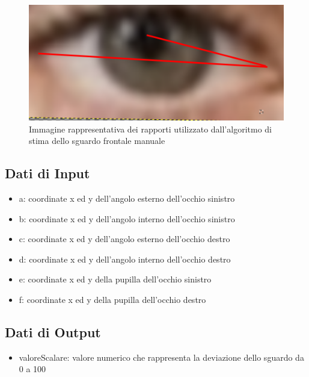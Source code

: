 \documentclass[12pt,a4paper,openright,twoside]{book}
\begin{document}
\begin{figure}
    \centering
    \includegraphics[width=.4\linewidth]{figures/frontal_gaze_manual.png}
    \caption{Immagine rappresentativa dei rapporti utilizzato dall'algoritmo di stima dello sguardo frontale manuale}
    \label{fig:frontal-gaze-manual}
\end{figure}

\subsection{Dati di Input}
\begin{itemize}
    \item a: coordinate x ed y dell'angolo esterno dell'occhio sinistro
    \item b: coordinate x ed y dell'angolo interno dell'occhio sinistro
    \item c: coordinate x ed y dell'angolo esterno dell'occhio destro
    \item d: coordinate x ed y dell'angolo interno dell'occhio destro
    \item e: coordinate x ed y della pupilla dell'occhio sinistro
    \item f: coordinate x ed y della pupilla dell'occhio destro
\end{itemize}
\subsection{Dati di Output}
\begin{itemize}
    \item valoreScalare: valore numerico che rappresenta la deviazione dello sguardo da 0 a 100
\end{itemize}
\end{document}
